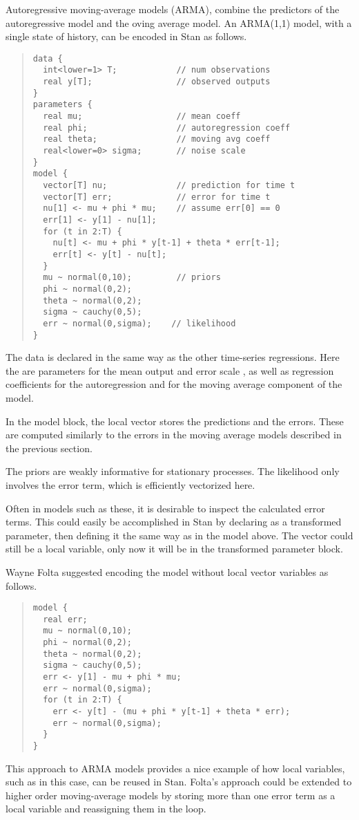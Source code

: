Autoregressive moving-average models (ARMA), combine the predictors
of the autoregressive model and the oving average model.  An
ARMA(1,1) model, with a single state of history, can be encoded in
Stan as follows.
%
\begin{quote}
\begin{Verbatim}[fontsize=\small]
data {
  int<lower=1> T;            // num observations
  real y[T];                 // observed outputs
}
parameters {
  real mu;                   // mean coeff
  real phi;                  // autoregression coeff
  real theta;                // moving avg coeff
  real<lower=0> sigma;       // noise scale
}
model {
  vector[T] nu;              // prediction for time t
  vector[T] err;             // error for time t
  nu[1] <- mu + phi * mu;    // assume err[0] == 0
  err[1] <- y[1] - nu[1];
  for (t in 2:T) {
    nu[t] <- mu + phi * y[t-1] + theta * err[t-1];
    err[t] <- y[t] - nu[t];
  }
  mu ~ normal(0,10);         // priors
  phi ~ normal(0,2);
  theta ~ normal(0,2);
  sigma ~ cauchy(0,5);
  err ~ normal(0,sigma);    // likelihood
}
\end{Verbatim}
\end{quote}
%
The data is declared in the same way as the other time-series
regressions.  Here the are parameters for the mean output 
and error scale , as well as regression coefficients
 for the autoregression and  for the moving
average component of the model.  

In the model block, the local vector  stores the predictions
and  the errors.  These are computed similarly to the
errors in the moving average models described in the previous section.  

The priors are weakly informative for stationary processes.  The
likelihood only involves the error term, which is efficiently
vectorized here.

Often in models such as these, it is desirable to inspect the
calculated error terms.  This could easily be accomplished in Stan by
declaring  as a transformed parameter, then defining it the
same way as in the model above.  The vector  could still be a
local variable, only now it will be in the transformed parameter block.

Wayne Folta suggested encoding the model without local vector
variables as follows.
%
\begin{quote}
\begin{Verbatim}[fontsize=\small]
model {
  real err;
  mu ~ normal(0,10);
  phi ~ normal(0,2);
  theta ~ normal(0,2);
  sigma ~ cauchy(0,5);
  err <- y[1] - mu + phi * mu;
  err ~ normal(0,sigma);
  for (t in 2:T) {
    err <- y[t] - (mu + phi * y[t-1] + theta * err); 
    err ~ normal(0,sigma);
  }
}
\end{Verbatim}
\end{quote}
%
This approach to ARMA models provides a nice example of how local
variables, such as  in this case, can be reused in Stan.
Folta's approach could be extended to higher order moving-average
models by storing more than one error term as a local variable and
reassigning them in the loop.  

